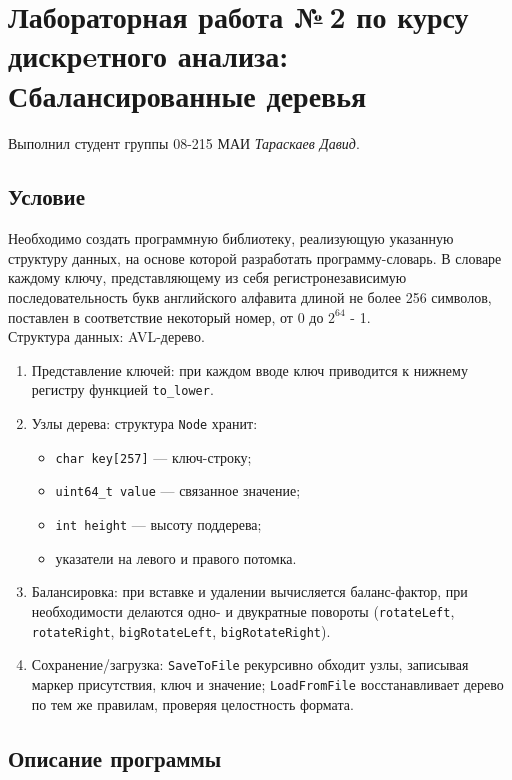 \documentclass[12pt]{article}
\begin{document}
\section*{Лабораторная работа №\,2 по курсу дискрeтного анализа: Сбалансированные деревья
}

Выполнил студент группы 08-215 МАИ \textit{Тараскаев Давид}.

\subsection*{Условие}


Необходимо создать программную библиотеку, реализующую указанную структуру данных, на основе которой разработать программу-словарь. В словаре каждому ключу, представляющему из себя регистронезависимую последовательность букв английского алфавита длиной не более 256 символов, поставлен в соответствие некоторый номер, от 0 до $2^{64}$ - 1. \\
Структура данных: AVL-дерево.


\begin{enumerate}
    \item Представление ключей: при каждом вводе ключ приводится к нижнему регистру функцией \verb|to_lower|.
    \item Узлы дерева: структура \texttt{Node} хранит:
      \begin{itemize}
        \item \texttt{char key[257]} — ключ-строку;
        \item \texttt{uint64\_t value} — связанное значение;
        \item \texttt{int height} — высоту поддерева;
        \item указатели на левого и правого потомка.
      \end{itemize}
    \item Балансировка: при вставке и удалении вычисляется баланс-фактор, при необходимости делаются одно- и двукратные повороты (\texttt{rotateLeft}, \texttt{rotateRight}, \texttt{bigRotateLeft}, \texttt{bigRotateRight}).
    \item Сохранение/загрузка:  
      \texttt{SaveToFile} рекурсивно обходит узлы, записывая маркер присутствия, ключ и значение;  
      \texttt{LoadFromFile} восстанавливает дерево по тем же правилам, проверяя целостность формата.
  \end{enumerate}
  
  \subsection*{Описание программы}
  
\end{document}
